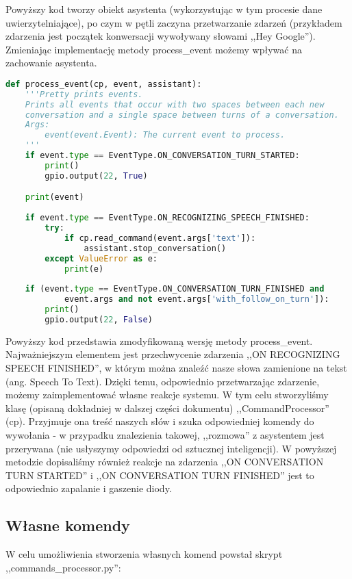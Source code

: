 Powyższy kod tworzy obiekt asystenta (wykorzystując w tym procesie dane uwierzytelniające),
po czym w pętli zaczyna przetwarzanie zdarzeń (przykładem zdarzenia jest początek konwersacji wywoływany słowami ,,Hey Google'').
Zmieniając implementację metody process\_event możemy wpływać na zachowanie asystenta.


\begin{lstlisting}[language=Python]
def process_event(cp, event, assistant):
    '''Pretty prints events.
    Prints all events that occur with two spaces between each new
    conversation and a single space between turns of a conversation.
    Args:
        event(event.Event): The current event to process.
    '''
    if event.type == EventType.ON_CONVERSATION_TURN_STARTED:
        print()
        gpio.output(22, True)

    print(event)
    
    if event.type == EventType.ON_RECOGNIZING_SPEECH_FINISHED:
        try:
            if cp.read_command(event.args['text']):
                assistant.stop_conversation()
        except ValueError as e:
            print(e)
            
    if (event.type == EventType.ON_CONVERSATION_TURN_FINISHED and
            event.args and not event.args['with_follow_on_turn']):
        print()
        gpio.output(22, False)
\end{lstlisting}

Powyższy kod przedstawia zmodyfikowaną wersję metody process\_event. Najważniejszym elementem jest przechwycenie zdarzenia ,,ON RECOGNIZING SPEECH FINISHED'', w którym można znaleźć nasze słowa zamienione na tekst (ang. Speech To Text). Dzięki temu, odpowiednio przetwarzając zdarzenie, możemy zaimplementować własne reakcje systemu. W tym celu stworzyliśmy klasę (opisaną dokładniej w dalszej części dokumentu) ,,CommandProcessor'' (cp). Przyjmuje ona treść naszych słów i szuka odpowiedniej komendy do wywołania - w przypadku znalezienia takowej, ,,rozmowa'' z asystentem jest przerywana (nie usłyszymy odpowiedzi od sztucznej inteligencji). W powyższej metodzie dopisaliśmy również reakcje na zdarzenia ,,ON CONVERSATION TURN STARTED'' i ,,ON CONVERSATION TURN FINISHED'' jest to odpowiednio zapalanie i gaszenie diody.

\subsection{Własne komendy}

W celu umożliwienia stworzenia własnych komend powstał skrypt ,,commands\_processor.py'':



